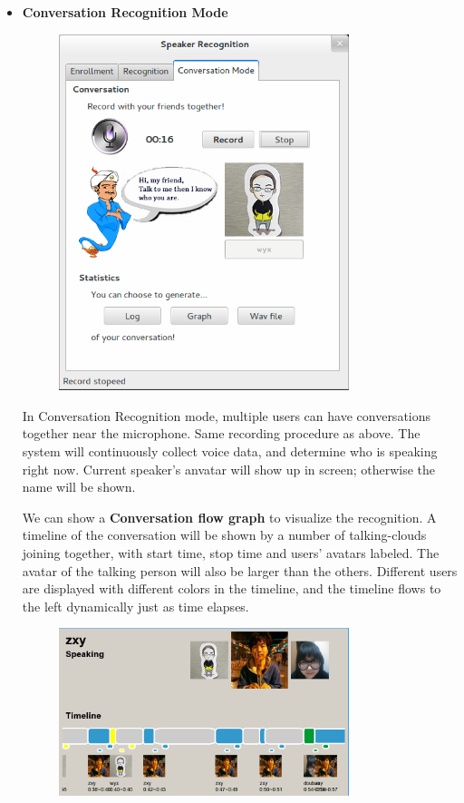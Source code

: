 \begin{itemize}
  \item \textbf{Conversation Recognition Mode} \\
    \begin{figure}[H]
      \centering
      \includegraphics[width=0.8\textwidth]{img/conversation.png}
      \caption{\label{fig:}}
    \end{figure}

    In Conversation Recognition mode, multiple users can have conversations
    together near the microphone. Same recording procedure as above.
    The system will continuously collect voice data, and determine
    who is speaking right now. Current speaker's anvatar will show up
    in screen; otherwise the name will be shown.

    We can show a \textbf{Conversation flow graph} to visualize the recognition.
    A timeline of the conversation will be shown by a number of
    talking-clouds joining together, with start time, stop time
    and users' avatars labeled. The avatar of the talking person will also be larger than the others.
    Different users are displayed with different colors in the timeline,
    and the timeline flows to the left dynamically just as time elapses.
    \begin{figure}[H]
      \centering
      \includegraphics[width=0.8\textwidth]{img/gui-graph.png}
    \end{figure}

\end{itemize}
